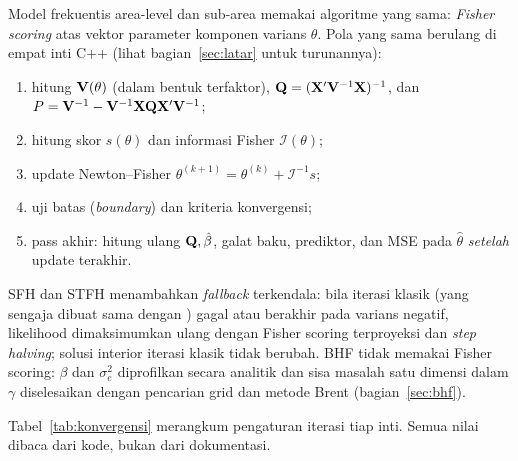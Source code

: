 Model frekuentis area-level dan sub-area memakai algoritme yang sama:
\emph{Fisher scoring} atas vektor parameter komponen varians $\theta$. Pola
yang sama berulang di empat inti C++ (lihat bagian~\ref{sec:latar} untuk
turunannya):

\begin{enumerate}[label=\arabic*.]
  \item hitung $\mathbf{V}(\theta)$ (dalam bentuk terfaktor), $\mathbf{Q}=(\mathbf{X}'\mathbf{V}^{-1}\mathbf{X})^{-1}$,
        dan $P=\mathbf{V}^{-1}-\mathbf{V}^{-1}\mathbf{X}\mathbf{Q}\mathbf{X}'\mathbf{V}^{-1}$;
  \item hitung skor $s(\theta)$ dan informasi Fisher $\mathcal I(\theta)$;
  \item update Newton--Fisher $\theta^{(k+1)}=\theta^{(k)}+\mathcal
        I^{-1}s$;
  \item uji batas (\emph{boundary}) dan kriteria konvergensi;
  \item pass akhir: hitung ulang $\mathbf{Q},\hat\beta$, galat baku, prediktor, dan MSE
        pada $\hat\theta$ \emph{setelah} update terakhir.
\end{enumerate}
SFH dan STFH menambahkan \emph{fallback} terkendala: bila iterasi klasik (yang
sengaja dibuat sama dengan ) gagal atau berakhir pada varians negatif,
likelihood dimaksimumkan ulang dengan Fisher scoring terproyeksi dan
\emph{step halving}; solusi interior iterasi klasik tidak berubah. BHF tidak
memakai Fisher scoring: $\beta$ dan $\sigma_e^2$ diprofilkan secara analitik
dan sisa masalah satu dimensi dalam $\gamma$ diselesaikan dengan pencarian grid
dan metode Brent (bagian~\ref{sec:bhf}).

Tabel~\ref{tab:konvergensi} merangkum pengaturan iterasi tiap inti. Semua nilai
dibaca dari kode, bukan dari dokumentasi.

